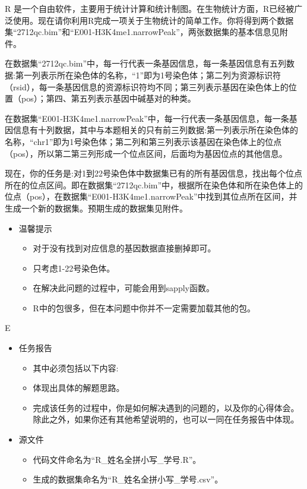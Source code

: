 \documentclass[12pt,a4paper]{article}
\begin{document}
\begin{ACEEproblem}{1.4}{\xiaosihao}{\youyuan}
R 是一个自由软件，主要用于统计计算和统计制图。在生物统计方面，R已经被广泛使用。现在请你利用R完成一项关于生物统计的简单工作。你将得到两个数据集``2712qc.bim''和``E001-H3K4me1.narrowPeak''，两张数据集的基本信息见附件。\par
在数据集``2712qc.bim''中，每一行代表一条基因信息，每一条基因信息有五列数据:第一列表示所在染色体的名称，``1''即为1号染色体；第二列为资源标识符（rsid），每一条基因信息的资源标识符均不同；第三列表示基因在染色体上的位置（pos）；第四、第五列表示基因中碱基对的种类。\par
在数据集``E001-H3K4me1.narrowPeak''中，每一行代表一条基因信息，每一条基因信息有十列数据，其中与本题相关的只有前三列数据:第一列表示所在染色体的名称，``chr1''即为1号染色体；第二列和第三列表示该基因在染色体上的位点（pos），所以第二第三列形成一个位点区间，后面均为基因位点的其他信息。\par
现在，你的任务是:对1到22号染色体中数据集已有的所有基因信息，找出每个位点所在的位点区间。即在数据集``2712qc.bim''中，根据所在染色体和所在染色体上的位点（pos），在数据集``E001-H3K4me1.narrowPeak''中找到其位点所在区间，并生成一个新的数据集。预期生成的数据集见附件。\par
\vspace*{4pt}
\begin{itemize}
	\item 温馨提示
	\begin{itemize}
		\item[1.] 对于没有找到对应信息的基因数据直接删掉即可。
		\item[2.] 只考虑1-22号染色体。
		\item[3.] 在解决此问题的过程中，可能会用到sapply函数。
		\item[4.] R中的包很多，但在本问题中你并不一定需要加载其他的包。
	\end{itemize}
\end{itemize}
\end{ACEEproblem}
\begin{ACEEsubmit}{E}
\begin{itemize}
	\item 任务报告
	\begin{itemize}
		\item[] 其中必须包括以下内容:
		\item[1.] 体现出具体的解题思路。
		\item[2.] 完成该任务的过程中，你是如何解决遇到的问题的，以及你的心得体会。除此之外，如果你还有其他希望说明的，也可以一同在任务报告中体现。
	\end{itemize}
	\item 源文件
	\begin{itemize}
		\item[1.] 代码文件命名为``R\_姓名全拼小写\_学号.R''。
		\item[2.] 生成的数据集命名为``R\_姓名全拼小写\_学号.csv''。
	\end{itemize}
\end{itemize}
\end{ACEEsubmit}
\end{document}
